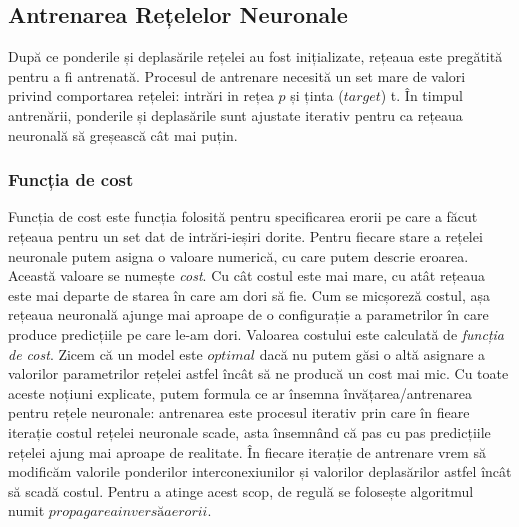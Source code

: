 \subsection{Antrenarea Rețelelor Neuronale}
După ce ponderile și deplasările rețelei au fost inițializate, rețeaua este pregătită pentru a fi antrenată. Procesul de antrenare necesită un set mare de valori privind comportarea rețelei: intrări in rețea $p$ și ținta ($target$) t. În timpul antrenării, ponderile și deplasările sunt ajustate iterativ pentru ca rețeaua neuronală să greșească cât mai puțin.\newline


\subsubsection{Funcția de cost} Funcția de cost este funcția folosită pentru specificarea erorii pe care a făcut rețeaua pentru un set dat de intrări-ieșiri dorite. Pentru fiecare stare a rețelei neuronale putem asigna o valoare numerică, cu care putem descrie eroarea. Această valoare se numește \textit{cost}.\newline
Cu cât costul este mai mare, cu atât rețeaua este mai departe de starea în care am dori să fie. Cum se micșoreză costul, așa rețeaua neuronală ajunge mai aproape de o configurație a parametrilor în care produce predicțiile pe care le-am dori. Valoarea costului este calculată de \textit{funcția de cost}. Zicem că un model este $optimal$ dacă nu putem găsi o altă asignare a valorilor parametrilor rețelei astfel încât să ne producă un cost mai mic.\newline
Cu toate aceste noțiuni explicate, putem formula ce ar însemna învățarea/antrenarea pentru rețele neuronale: antrenarea este procesul iterativ prin care în fieare iterație costul rețelei neuronale scade, asta însemnând că pas cu pas predicțiile rețelei ajung mai aproape de realitate. În fiecare iterație de antrenare vrem să modificăm valorile ponderilor interconexiunilor și valorilor deplasărilor astfel încât să scadă costul. Pentru a atinge acest scop, de regulă se folosește algoritmul numit $propagarea inversă a erorii$.


